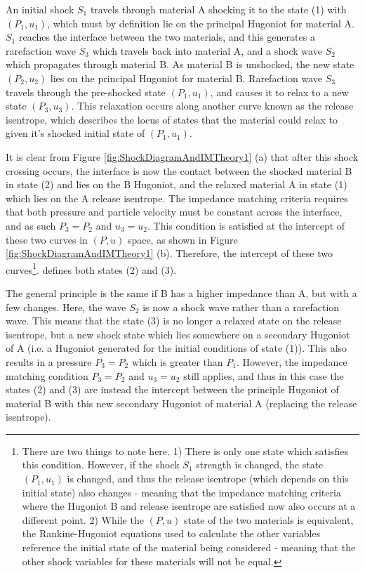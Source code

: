 An initial shock $S_1$ travels through material A shocking it to the state (1) with $(P_1, u_1)$, which must by definition lie on the principal Hugoniot for material A. $S_1$ reaches the interface between the two materials, and this generates a rarefaction wave $S_3$ which travels back into material A, and a shock wave $S_2$ which propagates through material B. As material B is unshocked, the new state $(P_2, u_2)$ lies on the principal Hugoniot for material B. Rarefaction wave $S_3$ travels through the pre-shocked state $(P_1, u_1)$, and causes it to relax to a new state $(P_3, u_3)$. This relaxation occurs along another curve known as the release isentrope, which describes the locus of states that the material could relax to given it's shocked initial state of $(P_1, u_1)$. 

It is clear from Figure \ref{fig:ShockDiagramAndIMTheory1} (a) that after this shock crossing occurs, the interface is now the contact between the shocked material B in state (2) and lies on the B Hugoniot, and the relaxed material A in state (1) which lies on the A release isentrope. The impedance matching criteria requires that both pressure and particle velocity must be constant across the interface, and as such $P_3 = P_2$ and $u_3 = u_2$. This condition is satisfied at the intercept of these two curves in $(P, u)$ space, as shown in Figure \ref{fig:ShockDiagramAndIMTheory1} (b). Therefore, the intercept of these two curves\footnote{There are two things to note here. 1) There is only one state which satisfies this condition. However, if the shock $S_1$ strength is changed, the state $(P_1, u_1)$ is changed, and thus the release isentrope (which depends on this initial state) also changes - meaning that the impedance matching criteria where the Hugoniot B and release isentrope are satisfied now also occurs at a different point. 2) While the $(P,u)$ state of the two materials is equivalent, the Rankine-Hugoniot equations used to calculate the other variables reference the initial state of the material being considered - meaning that the other shock variables for these materials will not be equal.}. defines both states (2) and (3). 

The general principle is the same if B has a higher impedance than A, but with a few changes. Here, the wave $S_2$ is now a shock wave rather than a rarefaction wave. This means that the state (3) is no longer a relaxed state on the release isentrope, but a new shock state which lies somewhere on a secondary Hugoniot of A (i.e. a Hugoniot generated for the initial conditions of state (1)). This also results in a pressure $P_3 = P_2$ which is greater than $P_1$. However, the impedance matching condition $P_3 = P_2$ and $u_3 = u_2$ still applies, and thus in this case the states (2) and (3) are instead the intercept between the principle Hugoniot of material B with this new secondary Hugoniot of material A (replacing the release isentrope).

